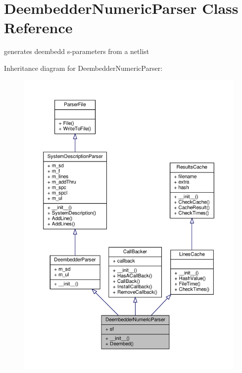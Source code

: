 \hypertarget{classSignalIntegrity_1_1Parsers_1_1DeembedderNumericParser_1_1DeembedderNumericParser}{}\section{Deembedder\+Numeric\+Parser Class Reference}
\label{classSignalIntegrity_1_1Parsers_1_1DeembedderNumericParser_1_1DeembedderNumericParser}


generates deembedd s-\/parameters from a netlist  




Inheritance diagram for Deembedder\+Numeric\+Parser\+:\nopagebreak
\begin{figure}[H]
\begin{center}
\leavevmode
\includegraphics[width=350pt]{classSignalIntegrity_1_1Parsers_1_1DeembedderNumericParser_1_1DeembedderNumericParser__inherit__graph}
\end{center}
\end{figure}


